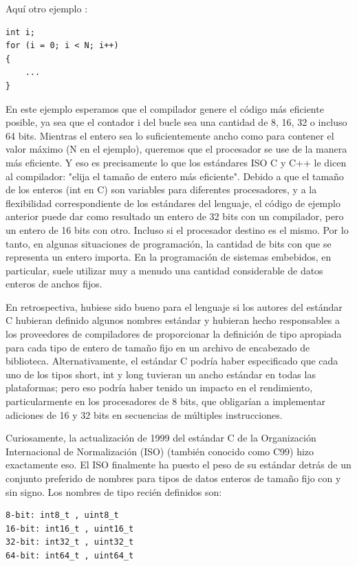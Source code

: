 \documentclass[output=paper, 
colorlinks,
citecolor=brown,
newtxmath
]{langscibook}
\begin{document}
Aquí otro ejemplo :

\begin{small}
\begin{verbatim}
int i;
for (i = 0; i < N; i++)
{
	...
}
\end{verbatim}
\end{small}

En este ejemplo esperamos que el compilador genere el código más eficiente posible, 
ya sea que el contador i del bucle sea una cantidad de 8, 16, 32 o incluso 64 bits.
Mientras el entero sea lo suficientemente ancho como para contener el valor máximo 
(N en el ejemplo), queremos que el procesador se use de la manera más eficiente. 
Y eso es precisamente lo que los estándares ISO C y C++ le dicen al compilador: 
"elija el tamaño de entero más eficiente". 
Debido a que el tamaño de los enteros (int en C) son variables para diferentes procesadores, 
y a la flexibilidad correspondiente de los estándares del lenguaje, 
el código de ejemplo anterior puede dar como resultado un entero de 32 bits 
con un compilador, pero un entero de 16 bits con otro. Incluso si el procesador destino es el mismo.
Por lo tanto, en algunas situaciones de programación, la cantidad de bits con que 
se representa un entero importa. 
En la programación de sistemas embebidos, en particular, suele 
utilizar muy a menudo una cantidad considerable de datos enteros 
de anchos fijos.

En retrospectiva, hubiese sido bueno para el lenguaje si los autores del estándar C 
hubieran definido algunos nombres estándar y hubieran hecho responsables a 
los proveedores de compiladores de proporcionar la definición de tipo apropiada 
para cada tipo de entero de tamaño fijo en un archivo de encabezado de biblioteca. 
Alternativamente, el estándar C podría haber especificado que cada uno de los 
tipos short, int y long tuvieran un ancho estándar en todas las plataformas; 
pero eso podría haber tenido un impacto en el rendimiento, 
particularmente en los procesadores de 8 bits, que obligarían a implementar 
adiciones de 16 y 32 bits en secuencias de múltiples instrucciones.

Curiosamente, la actualización de 1999 del estándar C de la Organización 
Internacional de Normalización (ISO) (también conocido como C99) 
hizo exactamente eso. El ISO finalmente ha puesto el peso de su 
estándar detrás de un conjunto preferido de nombres para tipos de datos 
enteros de tamaño fijo con y sin signo. Los nombres de tipo recién definidos son:

\begin{small}
\begin{verbatim}
8-bit: int8_t , uint8_t
16-bit: int16_t , uint16_t
32-bit: int32_t , uint32_t
64-bit: int64_t , uint64_t
\end{verbatim}
\end{small}
\end{document}
